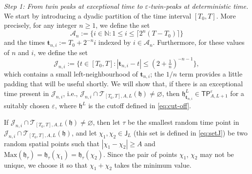 \documentclass[oneside,final,11pt]{amsart}
\theoremstyle{definition}
\newcommand{\fh}{\mathfrak{h}}
\newcommand{\TP}[1]{\mathsf{TP}_{\!\!#1}}
\newcommand{\bJ}{\mathsf{J}}
\newcommand{\nn}{\mathbb{N}}
\newcommand{\CT}{\mathcal{T}}
\newcommand{\1}[1]{\mathbf{1}_{#1}}
\newcommand{\eps}{\varepsilon}
\newcommand{\Max}{\mathrm{Max}}
\newcommand{\ft}{\mathbf{t}}
\newcommand{\CJ}{\mathcal{J}}
\newcommand{\CA}{\mathcal{A}}
\let\emptyset\varnothing
\numberwithin{equation}{section}
\begin{document}
\emph{Step 1: From twin peaks at exceptional time to $\eps$-twin-peaks at deterministic time.} We start by introducing a dyadic partition of the time interval $[T_0, T]$. More precisely, for any integer  $n \geq 1$, we define the set
$$\CA_n := \{i \in \nn : 1 \leq i \leq \lceil 2^n (T - T_0) \rceil\}$$
and the times $\ft_{n, i} := T_0 + 2^{-n} i$ indexed by $i \in \CA_n$. Furthermore, for these values of $n$ and $i$, we define the set
\begin{equation}%
\CJ_{n, i} := \bigl\{t \in [T_0,T] :  |\ft_{n, i} - t| \leq (2+\tfrac{1}{n})^{-n - 1}\bigr\},
\end{equation}
which contains a small left-neighbourhood of $\ft_{n, i}$; the $1/n$ term provides a little padding that will be useful shortly. We will show that, if there is an exceptional time present in $\CJ_{n, i}$, i.e., $\CJ_{n, i}\cap \CT_{[T_0,T],A,L}(\fh) \neq \emptyset$, then $\fh^L_{\ft_{n,i}} \in \TP{A, L + 1}^{\eps}$ for a suitably chosen $\eps$, where $\fh^L$ is the cutoff defined in \eqref{eq:cut-off}.

If $\CJ_{n, i} \cap \CT_{[T_0, T], A, L}(\fh) \neq \emptyset$, then let $\tau$ be the smallest random time point in $\CJ_{n, i} \cap \CT_{[T_0, T], A, L}(\fh)$, and let $\chi_1, \chi_2 \in \bJ_L$ (this set is defined in \eqref{eq:setJ}) be two random spatial points such that $|\chi_1 - \chi_2 | \geq A$ and $\Max(\fh_\tau) = \fh_\tau(\chi_1) = \fh_\tau(\chi_2)$. Since the pair of points $\chi_1$, $\chi_2$ may not be  unique, we choose it so that $\chi_1 + \chi_2$ takes the minimum value.
\end{document}
